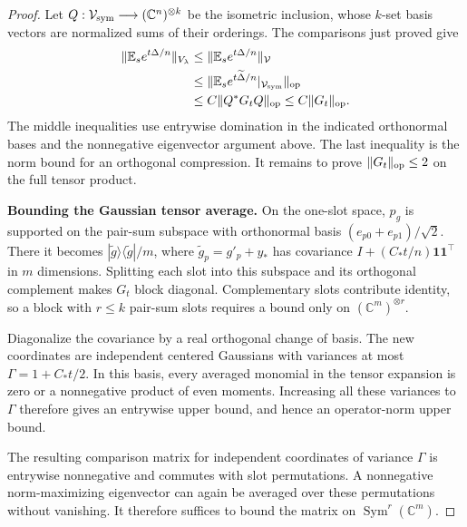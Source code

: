 \begin{proof}
Let $Q:\mathcal V_{\rm sym}\longrightarrow(\mathbb C^n)^{\otimes k}$
be the isometric inclusion, whose $k$-set basis vectors are normalized
sums of their orderings. The comparisons just proved give
\begin{equation}\label{cas:gaussian-norm-chain}
\begin{aligned}
 \|\mathbb E_s e^{t\Delta/n}\|_{V_\lambda}
 &\le\|\mathbb E_s e^{t\Delta/n}\|_{\mathcal V}\\
 &\le\|\mathbb E_s e^{t\widetilde\Delta/n}|_{\mathcal V_{\rm sym}}\|_{\mathrm{op}}\\
 &\le C\|Q^*G_tQ\|_{\mathrm{op}}\le C\|G_t\|_{\mathrm{op}}.
\end{aligned}
\end{equation}
The middle inequalities use entrywise domination in the indicated
orthonormal bases and the nonnegative eigenvector argument above.
The last inequality is the norm bound for an orthogonal compression.
It remains to prove $\|G_t\|_{\mathrm{op}}\le2$ on the full tensor product.

\medskip\noindent\textbf{Bounding the Gaussian tensor average.}\enspace
On the one-slot space, $p_g$ is supported on the pair-sum subspace
with orthonormal basis $(e_{p0}+e_{p1})/\sqrt2$. There it becomes
$|\widetilde g\rangle\langle\widetilde g|/m$, where
$\widetilde g_p=g'_p+y_*$ has covariance
$I+(C_*t/n)\mathbf1\mathbf1^\top$ in $m$ dimensions. Splitting each
slot into this subspace and its orthogonal complement makes $G_t$
block diagonal. Complementary slots contribute identity, so a block
with $r\le k$ pair-sum slots requires a bound only on
$(\mathbb C^m)^{\otimes r}$.

Diagonalize the covariance by a real orthogonal change of basis.
The new coordinates are independent centered Gaussians with variances
at most $\Gamma=1+C_*t/2$. In this basis, every averaged monomial
in the tensor expansion is zero or a nonnegative product of even
moments. Increasing all these variances to $\Gamma$ therefore gives
an entrywise upper bound, and hence an operator-norm upper bound.

The resulting comparison matrix for independent coordinates of variance
$\Gamma$ is entrywise nonnegative and commutes with slot permutations.
A nonnegative norm-maximizing eigenvector can again be averaged over
these permutations without vanishing. It therefore suffices to bound
the matrix on $\operatorname{Sym}^r(\mathbb C^m)$.


\end{proof}
